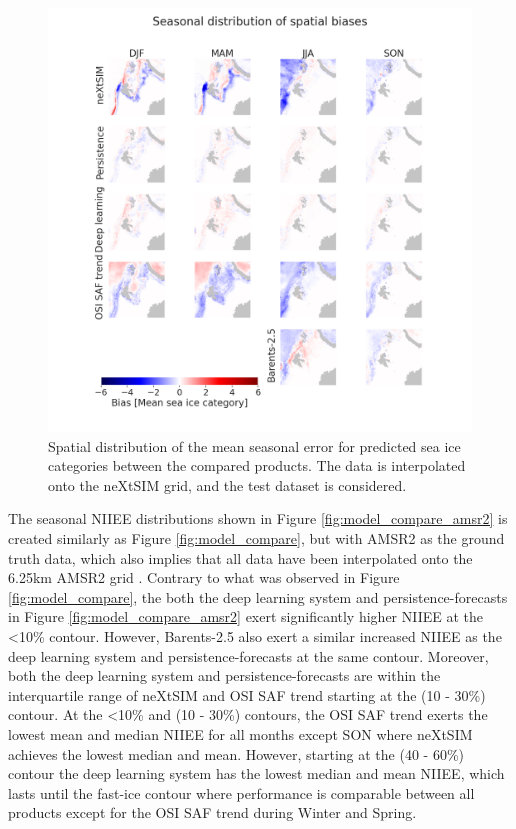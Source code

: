 \documentclass[../main/thesis.tex]{subfiles}
\begin{document}
\begin{figure}
    \centering
    \includegraphics[width=\textwidth]{anomalies}
    \caption{\label{fig:anomalies}Spatial distribution of the mean seasonal error for predicted sea ice categories between the compared products. The data is interpolated onto the neXtSIM grid, and the test dataset is considered.}
\end{figure}


The seasonal NIIEE distributions shown in Figure \ref{fig:model_compare_amsr2} is created similarly as Figure \ref{fig:model_compare}, but with AMSR2 as the ground truth data, which also implies that all data have been interpolated onto the 6.25km AMSR2 grid \citep{Spreen2008}. Contrary to what was observed in Figure \ref{fig:model_compare}, the both the deep learning system and persistence-forecasts in Figure \ref{fig:model_compare_amsr2} exert significantly higher NIIEE at the <10\% contour. However, Barents-2.5 also exert a similar increased NIIEE as the deep learning system and persistence-forecasts at the same contour. Moreover, both the deep learning system and persistence-forecasts are within the interquartile range of neXtSIM and OSI SAF trend starting at the (10 - 30\%) contour. At the <10\% and (10 - 30\%) contours, the OSI SAF trend exerts the lowest mean and median NIIEE for all months except SON where neXtSIM achieves the lowest median and mean. However, starting at the (40 - 60\%) contour the deep learning system has the lowest median and mean NIIEE, which lasts until the fast-ice contour where performance is comparable between all products except for the OSI SAF trend during Winter and Spring.
\end{document}
